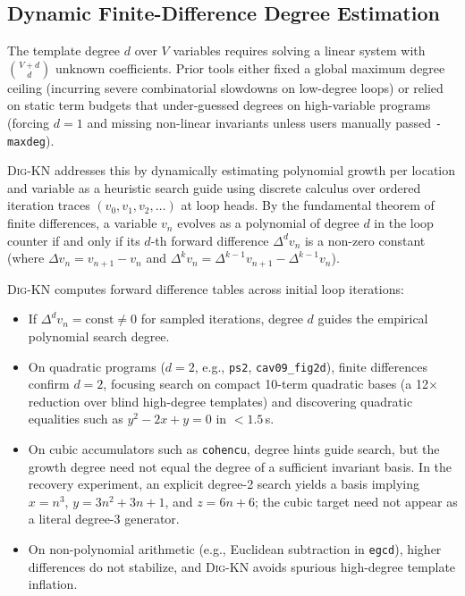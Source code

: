 \documentclass[runningheads]{llncs}
\newcommand{\tool}{\textsc{Dig-KN}\xspace}
\newcommand{\code}[1]{\texttt{\small #1}}
\begin{document}
\subsection{Dynamic Finite-Difference Degree Estimation}
\label{sec:degree}
The template degree $d$ over $V$ variables requires solving a linear system with $\binom{V+d}{d}$ unknown coefficients.  Prior tools either fixed a global maximum degree ceiling (incurring severe combinatorial slowdowns on low-degree loops) or relied on static term budgets that under-guessed degrees on high-variable programs (forcing $d=1$ and missing non-linear invariants unless users manually passed \code{-maxdeg}).

\tool{} addresses this by dynamically estimating polynomial growth per location and variable as a heuristic search guide using discrete calculus over ordered iteration traces $(v_0, v_1, v_2, \dots)$ at loop heads.  By the fundamental theorem of finite differences, a variable $v_n$ evolves as a polynomial of degree $d$ in the loop counter if and only if its $d$-th forward difference $\Delta^d v_n$ is a non-zero constant (where $\Delta v_n = v_{n+1} - v_n$ and $\Delta^k v_n = \Delta^{k-1} v_{n+1} - \Delta^{k-1} v_n$).

\tool{} computes forward difference tables across initial loop iterations:
\begin{itemize}[leftmargin=1.5em,itemsep=2pt]
\item If $\Delta^d v_n = \text{const} \ne 0$ for sampled iterations, degree $d$ guides the empirical polynomial search degree.
\item On quadratic programs ($d=2$, e.g., \code{ps2}, \code{cav09\_fig2d}), finite differences confirm $d=2$, focusing search on compact 10-term quadratic bases (a 12$\times$ reduction over blind high-degree templates) and discovering quadratic equalities such as $y^2 - 2x + y = 0$ in $<1.5$\,s.
\item On cubic accumulators such as \code{cohencu}, degree hints guide search, but the growth degree need not equal the degree of a sufficient invariant basis.  In the recovery experiment, an explicit degree-2 search yields a basis implying $x=n^3$, $y=3n^2+3n+1$, and $z=6n+6$; the cubic target need not appear as a literal degree-3 generator.
\item On non-polynomial arithmetic (e.g., Euclidean subtraction in \code{egcd}), higher differences do not stabilize, and \tool{} avoids spurious high-degree template inflation.
\end{itemize}
\end{document}
